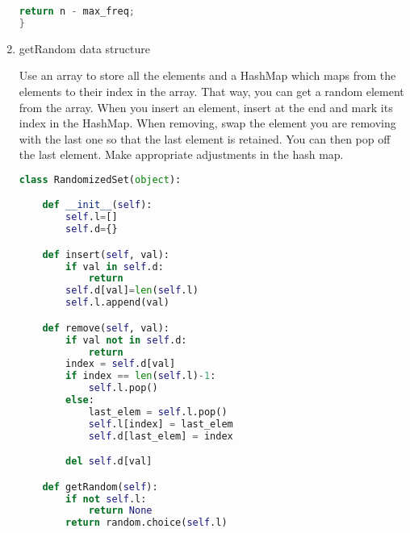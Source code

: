 \documentclass{article}
\begin{document}
\begin{enumerate}
\begin{lstlisting}[language=Java]
    return n - max_freq;
}
\end{lstlisting}
\item getRandom data structure

Use an array to store all the elements and a HashMap which maps from the elements to their index in the array. That way, you can get a random element from the array. When you insert an element, insert at the end and mark its index in the HashMap. When removing, swap the element you are removing with the last one so that the last element is retained. You can then pop off the last element. Make appropriate adjustments in the hash map.

\begin{lstlisting}[language=Python]
class RandomizedSet(object):

    def __init__(self):
        self.l=[]
        self.d={}

    def insert(self, val):
        if val in self.d:
            return
        self.d[val]=len(self.l)
        self.l.append(val)

    def remove(self, val):
        if val not in self.d:
            return
        index = self.d[val]
        if index == len(self.l)-1:
            self.l.pop()
        else:
            last_elem = self.l.pop()
            self.l[index] = last_elem
            self.d[last_elem] = index

        del self.d[val]

    def getRandom(self):
        if not self.l:
            return None
        return random.choice(self.l)

\end{lstlisting}

\end{enumerate}
\end{document}
